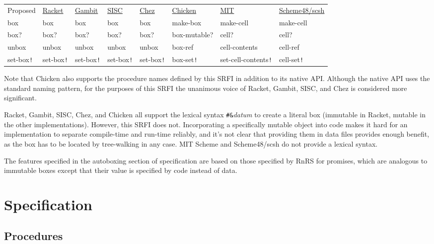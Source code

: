 \begin{longtable}[]{@{}llllllll@{}}
\toprule
Proposed &
\href{http://docs.racket-lang.org/reference/boxes.html}{Racket} &
\href{http://www.iro.umontreal.ca/~gambit/doc/gambit-c.html\#index-boxes}{Gambit}
& \href{http://sisc-scheme.org/manual/html/ch03.html\#Boxing}{SISC} &
\href{http://www.scheme.com/csug7/objects.html\#g50}{Chez} &
\href{http://wiki.call-cc.org/eggref/4/box}{Chicken} &
\href{http://web.mit.edu/scheme_v9.0.1/doc/mit-scheme-ref/Cells.html}{MIT}
&
\href{http://s48.org/1.1/manual/s48manual_42.html}{Scheme48/scsh}\tabularnewline
box & box & box & box & box & make-box & make-cell &
make-cell\tabularnewline
box? & box? & box? & box? & box? & box-mutable? & cell? &
cell?\tabularnewline
unbox & unbox & unbox & unbox & unbox & box-ref & cell-contents &
cell-ref\tabularnewline
set-box\texttt{!} & set-box\texttt{!} & set-box\texttt{!} &
set-box\texttt{!} & set-box\texttt{!} & box-set\texttt{!} &
set-cell-contents\texttt{!} & cell-set\texttt{!}\tabularnewline
\bottomrule
\end{longtable}

Note that Chicken also supports the procedure names defined by this SRFI
in addition to its native API. Although the native API uses the standard
naming pattern, for the purposes of this SRFI the unanimous voice of
Racket, Gambit, SISC, and Chez is considered more significant.

Racket, Gambit, SISC, Chez, and Chicken all support the lexical syntax
\texttt{\#\&}\emph{datum} to create a literal box (immutable in Racket,
mutable in the other implementations). However, this SRFI does not.
Incorporating a specifically mutable object into code makes it hard for
an implementation to separate compile-time and run-time reliably, and
it's not clear that providing them in data files provides enough
benefit, as the box has to be located by tree-walking in any case. MIT
Scheme and Scheme48/scsh do not provide a lexical syntax.

The features specified in the autoboxing section of specification are
based on those specified by RnRS for promises, which are analogous to
immutable boxes except that their value is specified by code instead of
data.

\section{Specification}\label{specification}

\subsection{Procedures}\label{procedures}

